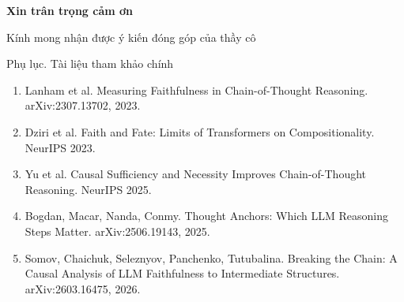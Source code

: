 \documentclass[aspectratio=169,t,10pt]{beamer}
\begin{document}
\begin{frame}[c,noframenumbering]
\centering
{\Large\bfseries Xin trân trọng cảm ơn\par}
\vspace{0.4cm}
{Kính mong nhận được ý kiến đóng góp của thầy cô\par}
\end{frame}

\appendix
\begin{frame}{Phụ lục. Tài liệu tham khảo chính}
\small
\begin{enumerate}
  \setlength{\itemsep}{6pt}
  \item Lanham et al. Measuring Faithfulness in Chain-of-Thought Reasoning. arXiv:2307.13702, 2023.
  \item Dziri et al. Faith and Fate: Limits of Transformers on Compositionality. NeurIPS 2023.
  \item Yu et al. Causal Sufficiency and Necessity Improves Chain-of-Thought Reasoning. NeurIPS 2025.
  \item Bogdan, Macar, Nanda, Conmy. Thought Anchors: Which LLM Reasoning Steps Matter. arXiv:2506.19143, 2025.
  \item Somov, Chaichuk, Seleznyov, Panchenko, Tutubalina. Breaking the Chain: A Causal Analysis of LLM Faithfulness to Intermediate Structures. arXiv:2603.16475, 2026.
\end{enumerate}
\end{frame}
\end{document}
